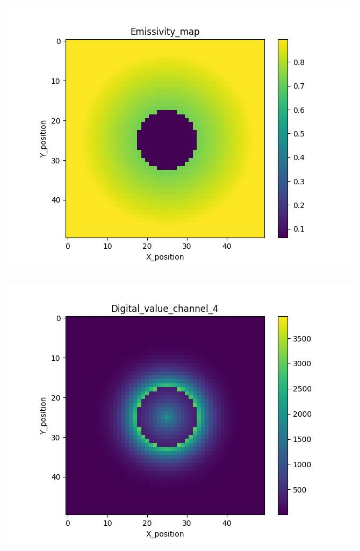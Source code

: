 \begin{figure}[htbp]
    \begin{minipage}{\textwidth}
        \centering
        \begin{subfigure}{0.45\textwidth}
            \includegraphics[width=\textwidth]{figures/raw_data/21/emi_field.jpg}
        \end{subfigure}
        \begin{subfigure}{0.45\textwidth}
            \centering
            \includegraphics[width=\textwidth]{figures/raw_data/21/digital_value_channel_4.jpg}
        \end{subfigure}
        \label{fig: raw_data_21}
    \end{minipage}\\

\end{figure}
